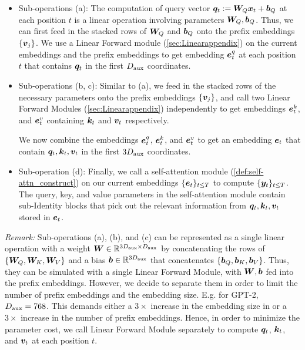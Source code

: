 \begin{itemize}
    \item Sub-operations (a): The computation of query vector ${\bm{q}}_t := {\bm{W}}_Q {\bm{x}}_t + {\bm{b}}_Q$  at each position $t$ is a linear operation involving parameters ${\bm{W}}_Q, {\bm{b}}_Q$. Thus, we can first feed in the stacked rows of ${\bm{W}}_Q$ and ${\bm{b}}_Q$ onto the prefix embeddings $\{ {\bm{v}}_j \}$. We use a Linear Forward module (\cref{sec:Linearappendix}) on the current embeddings and the prefix embeddings to get embedding $\ve^q_{t}$ at each position $t$ that contains ${\bm{q}}_t$ in the first $D_{\text{aux}}$ coordinates.

    \item Sub-operations (b, c): Similar to (a), we feed in the stacked rows of the necessary parameters onto the prefix embeddings $\{ {\bm{v}}_j \}$, and call two Linear Forward Modules (\cref{sec:Linearappendix}) independently to get embeddings $\ve^k_t$, and $\ve^v_t$ containing ${\bm{k}}_t$ and ${\bm{v}}_t$ respectively.

    We now combine the embeddings $\ve^q_t$, $\ve^k_t$, and $\ve^v_t$ to get an embedding $\ve_t$ that contain ${\bm{q}}_t, {\bm{k}}_t, {\bm{v}}_t$ in the first $3D_{\text{aux}}$ coordinates.
    
    \item Sub-operation (d): Finally, we call a \simulator{} self-attention module (\cref{def:self-attn_construct}) on our current embeddings $\{ \ve_t \}_{t \le T}$ to compute $\{ {\bm{y}}_t \}_{t \le T}$. The query, key, and value parameters in the self-attention module  contain sub-Identity blocks that pick out the relevant information from ${\bm{q}}_t, {\bm{k}}_t, {\bm{v}}_t$ stored in $\ve_t$.
\end{itemize}

\textit{Remark:} Sub-operations (a), (b), and (c) can be represented as a single linear operation with a weight ${\bm{W}} \in \mathbb{R}^{3 D_{\text{aux}} \times D_{\text{aux}} }$ by concatenating the rows of $\{{\bm{W}}_Q, {\bm{W}}_K, {\bm{W}}_V\}$ and a bias ${\bm{b}} \in \mathbb{R}^{3 D_{\text{aux}}}$ that concatenates $\{{\bm{b}}_Q, {\bm{b}}_K, {\bm{b}}_V\}$. Thus, they can be simulated with a single Linear Forward Module, with ${\bm{W}}, {\bm{b}}$ fed into the prefix embeddings.
However, we decide to separate them in order to limit the number of prefix embeddings and the embedding size. E.g. for GPT-2, $D_{\text{aux}} = 768$. This demands either a $3\times$ increase in the embedding size in \simulator{} or a $3\times$ increase in the number of prefix embeddings. Hence, in order to minimize the parameter cost, we call Linear Forward Module separately to compute ${\bm{q}}_t$, ${\bm{k}}_t$, and ${\bm{v}}_t$ at each position $t$.



